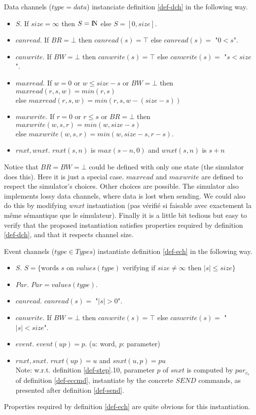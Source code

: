 \documentclass{article}
\newcommand{\NAT}{\mbox{\normalfont I$\!$N}}
\begin{document}
\vspace{1mm}
Data channels ($type=data$) instanciate definition \ref{def-dch} in the following way. 
\begin{itemize}
\item $S$. If $size=\infty$ then $S=\NAT$ else $S=[0,size]$.
\item $canread$. If $BR=\bot$ then $canread(s)=\top$ else $canread(s)=$ "$0<s$".
\item $canwrite$. If $BW=\bot$ then $canwrite(s)=\top$ else $canwrite(s)=$ "$s<size$".
\item $maxread.$ If $w=0$ or $w\leq size-s$ or $BW=\bot$ then $maxread(r,s,w)=min(r,s)$\\ else $maxread(r,s,w)=min(r,s,w-(size-s))$
\item $maxwrite.$ If $r=0$ or $r\leq s$ or $BR=\bot$ then $maxwrite(w,s,r)=min(w,size-s)$\\ else $maxwrite(w,s,r)=min(w,size-s,r-s)$.
\item $rnxt, wnxt.$ $rnxt(s,n)$ is $max(s-n,0)$ and $wnxt(s,n)$ is $s+n$
\end{itemize}
Notice that $BR=BW=\bot$ could be defined with only one state (the simulator does this). Here it is just a special case. $maxread$ and $maxwrite$ are defined to respect the simulator's choices. Other choices are possible. The simulator also implements lossy data channels, where data is lost when sending. We could also do this by modifying $wnxt$ instantiation (pas vérifié si faisable avec exactement la même sémantique que le simulateur).  Finally it is a little bit tedious but easy to verify that the proposed instantiation satisfies properties required by definition \ref{def-dch}, and that it respects channel size.

Event channels ($type\in Types$) instantiate definition \ref{def-ech} in the following way. 
\begin{itemize}
\item $S$. $S=\{\mbox{words $s$ on } values(type) \mbox{ verifying if } size\neq \infty \mbox{ then } |s|\leq size\} $
\item $Par$. $Par=values(type)$.
\item $canread$. $canread(s)=$ "$|s|>0$".
\item $canwrite$. If $BW=\bot$ then $canwrite(s)=\top$ else $canwrite(s)=$ "$|s|<size$".
\item $event.$ $event(up)=p$. ($u$: word, $p$: parameter)
\item $rnxt, snxt$. $rnxt(up)=u$ and $snxt(u,p)= pu$\\
      Note: w.r.t. definition \ref{def-step}.10, parameter $p$ of $snxt$ is computed by $par_{c_s}$ of definition \ref{def-eccmd}, instantiate by the concrete $SEN\!D$ commands, as presented after definition \ref{def-send}.
\end{itemize}
Properties required by definition \ref{def-ech} are quite obvious for this instantiation.
\end{document}
